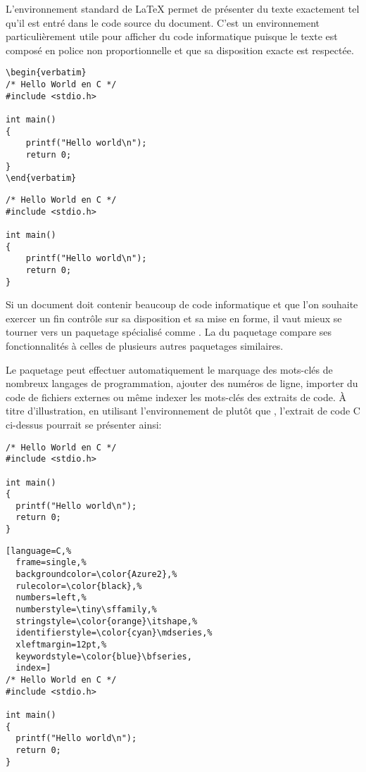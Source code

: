 L'environnement standard  de {\LaTeX} permet de présenter
du texte exactement tel qu'il est entré dans le code source du
document. C'est un environnement particulièrement utile pour afficher
du code informatique puisque le texte est composé en police non
proportionnelle et que sa disposition exacte est respectée.

\begin{demo}
  \begin{texample}
\begin{lstlisting}
\begin{verbatim}
/* Hello World en C */
#include <stdio.h>

int main()
{
    printf("Hello world\n");
    return 0;
}
\end{verbatim}
\end{lstlisting}
    \producing
\begin{verbatim}
/* Hello World en C */
#include <stdio.h>

int main()
{
    printf("Hello world\n");
    return 0;
}
\end{verbatim}
  \end{texample}
\end{demo}

Si un document doit contenir beaucoup de code informatique et que l'on
souhaite exercer un fin contrôle sur sa disposition et sa mise en
forme, il vaut mieux se tourner vers un paquetage spécialisé comme
 \citep{listings}. La %
du paquetage compare ses fonctionnalités à celles de plusieurs autres
paquetages similaires.

Le paquetage  peut effectuer automatiquement le marquage
des mots-clés de nombreux langages de programmation, ajouter des
numéros de ligne, importer du code de fichiers externes ou même
indexer les mots-clés des extraits de code. À titre d'illustration, en
utilisant l'environnement  de  plutôt que
, l'extrait de code C ci-dessus pourrait se présenter
ainsi:
\begin{demo}
  \begin{texample}
    \begin{vglisting}
\begin{lstlisting}
/* Hello World en C */
#include <stdio.h>

int main()
{
  printf("Hello world\n");
  return 0;
}
\end{lstlisting}
    \end{vglisting}
    \producing
\begin{lstlisting}[language=C,%
  frame=single,%
  backgroundcolor=\color{Azure2},%
  rulecolor=\color{black},%
  numbers=left,%
  numberstyle=\tiny\sffamily,%
  stringstyle=\color{orange}\itshape,%
  identifierstyle=\color{cyan}\mdseries,%
  xleftmargin=12pt,%
  keywordstyle=\color{blue}\bfseries,
  index=]
/* Hello World en C */
#include <stdio.h>

int main()
{
  printf("Hello world\n");
  return 0;
}
\end{lstlisting}
  \end{texample}
\end{demo}

